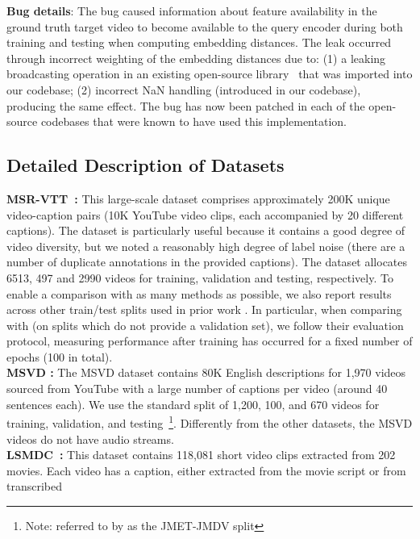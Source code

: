 \documentclass{bmvc2k}
\begin{document}
\noindent \textbf{Bug details}: The bug caused information about feature availability in the ground truth target video to become available to the query encoder during both training and testing when computing embedding distances.  The leak occurred through incorrect weighting of the embedding distances due to: (1) a leaking broadcasting operation in an existing open-source library~\cite{miech2018learning} that was imported into our codebase; (2) incorrect NaN handling (introduced in our codebase), producing the same effect.  The bug has now been patched in each of the open-source codebases that were known to have used this implementation.  


\subsection{Detailed Description of Datasets}
\textbf{MSR-VTT~\cite{xu2016msr}:} This large-scale dataset comprises approximately 200K unique video-caption pairs (10K YouTube video clips, each accompanied by 20 different captions).  The dataset is particularly useful because it contains a good degree of video diversity, but we noted a reasonably high degree of label noise (there are a number of duplicate annotations in the provided captions).  The dataset allocates 6513, 497 and 2990 videos for training, validation and testing, respectively. To enable a comparison with as many methods as possible, we also report results across other train/test splits used in prior work \cite{yu2018joint,miech2018learning}. In particular, when comparing with \cite{miech2018learning} (on splits which do not provide a validation set), we follow their evaluation protocol, measuring performance after training has occurred for a fixed number of epochs (100 in total).  \\
\textbf{MSVD \cite{chen2011collecting}:} The MSVD dataset contains 80K English descriptions for 1,970 videos sourced from YouTube with a large number of captions per video (around 40 sentences each). We use the standard split of 1,200, 100, and 670 
videos for training, validation, and testing~\cite{venugopalan2015sequence,xu2015jointly}\footnote{Note: referred to by \cite{mithun2018learning} as the JMET-JMDV split}. Differently from the other datasets, the MSVD videos do not have audio streams. \\
\textbf{LSMDC~\cite{rohrbach2015dataset}:} This dataset contains 118,081 short video clips extracted from
202 movies. Each video has a caption, either extracted from the movie script or from transcribed 
\end{document}
